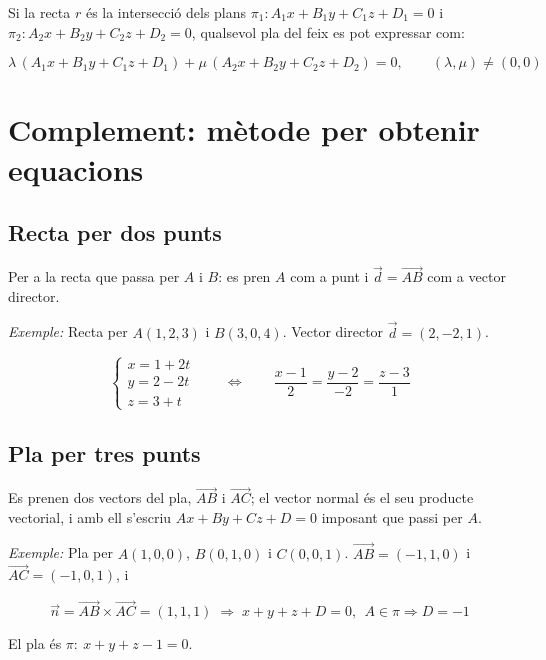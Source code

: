 Si la recta $r$ és la intersecció dels plans $\pi_1: A_1x + B_1y + C_1z + D_1 = 0$ i $\pi_2: A_2x + B_2y + C_2z + D_2 = 0$, qualsevol pla del feix es pot expressar com:

\begin{equation*}
\lambda\,(A_1x + B_1y + C_1z + D_1) + \mu\,(A_2x + B_2y + C_2z + D_2) = 0, \qquad (\lambda, \mu) \neq (0, 0)
\end{equation*}

\section{Complement: mètode per obtenir equacions}

\subsection{Recta per dos punts}

Per a la recta que passa per $A$ i $B$: es pren $A$ com a punt i $\vec d=\overrightarrow{AB}$ com a vector director.

\emph{Exemple:} Recta per $A(1,2,3)$ i $B(3,0,4)$. Vector director $\vec d=(2,-2,1)$.

\begin{equation*}
\begin{cases}x=1+2t\\y=2-2t\\z=3+t\end{cases}\qquad\Longleftrightarrow\qquad\frac{x-1}{2}=\frac{y-2}{-2}=\frac{z-3}{1}
\end{equation*}

\subsection{Pla per tres punts}

Es prenen dos vectors del pla, $\overrightarrow{AB}$ i $\overrightarrow{AC}$; el vector normal és el seu producte vectorial, i amb ell s'escriu $Ax+By+Cz+D=0$ imposant que passi per $A$.

\emph{Exemple:} Pla per $A(1,0,0)$, $B(0,1,0)$ i $C(0,0,1)$. $\overrightarrow{AB}=(-1,1,0)$ i $\overrightarrow{AC}=(-1,0,1)$, i

\begin{equation*}
\vec n=\overrightarrow{AB}\times\overrightarrow{AC}=(1,1,1)\;\Rightarrow\;x+y+z+D=0,\ \ A\in\pi\Rightarrow D=-1
\end{equation*}

El pla és $\pi:\ x+y+z-1=0$.

